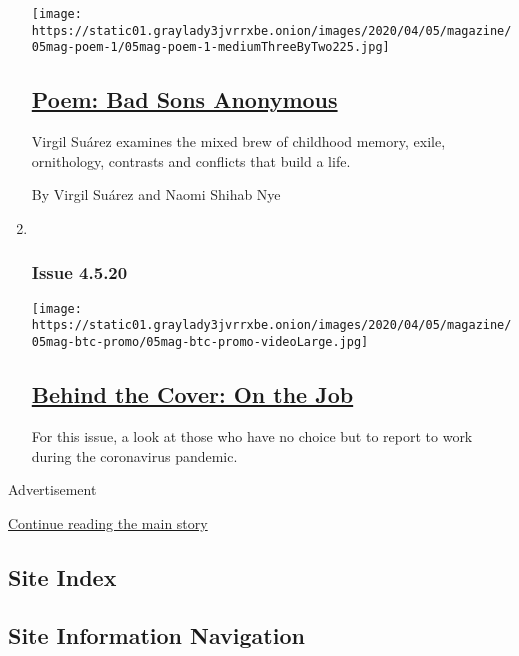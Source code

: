 \begin{enumerate}
  \texttt{[image: https://static01.graylady3jvrrxbe.onion/images/2020/04/05/magazine/05mag-poem-1/05mag-poem-1-mediumThreeByTwo225.jpg]}

  \hypertarget{poem-bad-sons-anonymous}{%
  \subsection{\texorpdfstring{\href{/2020/04/02/magazine/poem-bad-sons-anonymous.html}{Poem:
  Bad Sons
  Anonymous}}{Poem: Bad Sons Anonymous}}\label{poem-bad-sons-anonymous}}

  Virgil Suárez examines the mixed brew of childhood memory, exile,
  ornithology, contrasts and conflicts that build a life.

  By Virgil Suárez and Naomi Shihab Nye
\item ~
  \hypertarget{issue-4520}{%
  \subsubsection{Issue 4.5.20}\label{issue-4520}}

  \texttt{[image: https://static01.graylady3jvrrxbe.onion/images/2020/04/05/magazine/05mag-btc-promo/05mag-btc-promo-videoLarge.jpg]}

  \hypertarget{behind-the-cover-on-the-job}{%
  \subsection{\texorpdfstring{\href{/2020/04/03/magazine/behind-the-cover-on-the-job.html}{Behind
  the Cover: On the
  Job}}{Behind the Cover: On the Job}}\label{behind-the-cover-on-the-job}}

  For this issue, a look at those who have no choice but to report to
  work during the coronavirus pandemic.
\end{enumerate}

Advertisement

\protect\hyperlink{after-mid1}{Continue reading the main story}

\hypertarget{site-index}{%
\subsection{Site Index}\label{site-index}}

\hypertarget{site-information-navigation}{%
\subsection{Site Information
Navigation}\label{site-information-navigation}}

